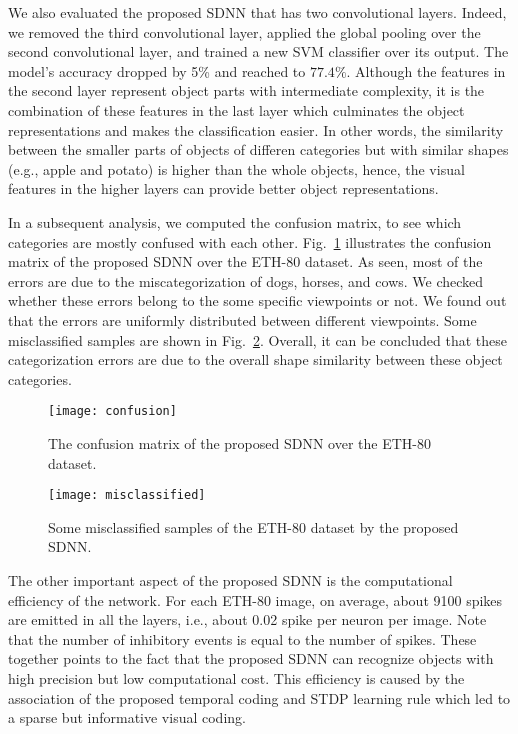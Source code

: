 \documentclass[preprint,5p,12pt,twocolumn]{article}
\begin{document}
We also evaluated the proposed SDNN that has two convolutional layers. Indeed, we removed the third convolutional layer, applied the global pooling over the second convolutional layer, and trained a new SVM classifier over its output. The model's accuracy dropped by 5\% and reached to $77.4\%$. Although the features in the second layer represent object parts with intermediate complexity, it is the combination of these features in the last layer which culminates the object representations and makes the classification easier. In other words, the  similarity between the smaller parts of objects of differen categories but with similar shapes (e.g., apple and potato) is higher than the whole objects, hence, the visual features in the higher layers can provide better object representations.



In a subsequent analysis, we computed the confusion matrix, to see which categories are mostly confused with each other. Fig.~\ref{figure4} illustrates the confusion matrix of the proposed SDNN over the ETH-80 dataset. As seen, most of the errors are due to the miscategorization of dogs, horses, and cows. We checked whether these errors belong to the some specific viewpoints or not. We found out that the errors are uniformly distributed between different viewpoints. Some misclassified samples are shown in Fig.~\ref{figure4_2}. Overall, it can be concluded that these categorization errors are due to the overall shape similarity between these object categories.

\begin{figure}[!t]
\centering
\texttt{[image: confusion]}
\caption{ The confusion matrix of the proposed SDNN over the ETH-80 dataset.}
\label{figure4}
\end{figure}

\begin{figure}[!t]
\centering
\texttt{[image: misclassified]}
\caption{ Some misclassified samples of the ETH-80 dataset by the proposed SDNN.}
\label{figure4_2}
\end{figure}

The other important aspect of the proposed SDNN is the computational efficiency of the network. For each ETH-80 image, on average, about 9100 spikes are emitted in all the layers, i.e., about 0.02 spike per neuron per image. Note that the number of inhibitory events is equal to the number of spikes. These together points to the fact that the proposed SDNN can recognize objects with high precision but low computational cost. This efficiency is caused by the association of the proposed temporal coding and STDP learning rule which led to a sparse but informative visual coding.
\end{document}
